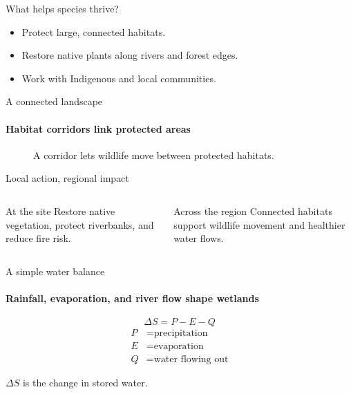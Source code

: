 \documentclass[10pt,aspectratio=169]{beamer}
\begin{document}
\begin{frame}{What helps species thrive?}
  \begin{itemize}
    \item Protect large, connected habitats.
    \item Restore native plants along rivers and forest edges.
    \item Work with Indigenous and local communities.
  \end{itemize}
\end{frame}

\begin{frame}{A connected landscape}
  \framesubtitle{Habitat corridors link protected areas}
  \begin{figure}
    \centering
    \caption{A corridor lets wildlife move between protected habitats.}
  \end{figure}
\end{frame}

\begin{frame}{Local action, regional impact}
  \begin{columns}[T,onlytextwidth]
    \begin{block}{At the site}
      Restore native vegetation, protect riverbanks, and reduce fire risk.
    \end{block}
    \begin{exampleblock}{Across the region}
      Connected habitats support wildlife movement and healthier water flows.
    \end{exampleblock}
  \end{columns}
\end{frame}

\begin{frame}{A simple water balance}
  \framesubtitle{Rainfall, evaporation, and river flow shape wetlands}
  \begin{equation*}
    \Delta S = P - E - Q
  \end{equation*}
  \begin{align*}
    P & = \text{precipitation} \\
    E & = \text{evaporation} \\
    Q & = \text{water flowing out}
  \end{align*}
  \begin{center}\small $\Delta S$ is the change in stored water.
  \end{center}
\end{frame}
\end{document}
